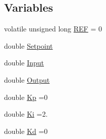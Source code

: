\subsection*{Variables}
\begin{DoxyCompactItemize}
\item 
volatile unsigned long \hyperlink{Yun__ChargePump__AnalogOut_8ino_a9ccc6cb5947ae2706a6e5da6088aeff7}{R\-E\-F} = 0
\item 
double \hyperlink{Yun__ChargePump__AnalogOut_8ino_a75c4a1f32ff8946a7e4880300dc7d309}{Setpoint}
\item 
double \hyperlink{Yun__ChargePump__AnalogOut_8ino_a1650ded891a8683614e014008c96278c}{Input}
\item 
double \hyperlink{Yun__ChargePump__AnalogOut_8ino_abe306616e5964581019974a7d94cffe2}{Output}
\item 
double \hyperlink{Yun__ChargePump__AnalogOut_8ino_afd070d90e3f8bb3e9bb9c6dff310503b}{Kp} =0
\item 
double \hyperlink{Yun__ChargePump__AnalogOut_8ino_aad5977a9e83736178f3b724a1d228652}{Ki} =2.
\item 
double \hyperlink{Yun__ChargePump__AnalogOut_8ino_ab9e6bbb0361dc98bc2f5399d014c6c01}{Kd} =0
\end{DoxyCompactItemize}


